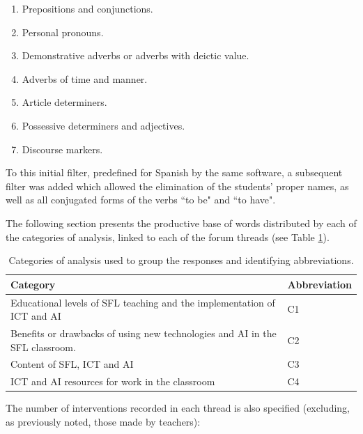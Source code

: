 \documentclass[english]{textolivre}
\begin{document}
\begin{enumerate}[label=\alph*)]
\item Prepositions and conjunctions.
\item Personal pronouns.
\item Demonstrative adverbs or adverbs with deictic value.
\item Adverbs of time and manner.
\item Article determiners.
\item Possessive determiners and adjectives.
\item Discourse markers.
\end{enumerate}

To this initial filter, predefined for Spanish by the same software, a subsequent filter was added which allowed the elimination of the students' proper names, as well as all conjugated forms of the verbs ``to be" and ``to have".

The following section presents the productive base of words distributed by each of the categories of analysis, linked to each of the forum threads (see Table \ref{tab-1}). 

\begin{table}[h]
\centering
\begin{threeparttable}
\caption{Categories of analysis used to group the responses and identifying abbreviations.}\label{tab-1}
\begin{tabular}{ll}
\toprule
Category & Abbreviation \\
\midrule
Educational levels of SFL teaching and the implementation of ICT and AI & C1 \\
Benefits or drawbacks of using new technologies and AI in the SFL classroom. & C2 \\
Content of SFL, ICT and AI & C3 \\
ICT and AI resources for work in the classroom & C4 \\
\bottomrule
\end{tabular}
\end{threeparttable}
\end{table}

The number of interventions recorded in each thread is also specified (excluding, as previously noted, those made by teachers):
\end{document}
